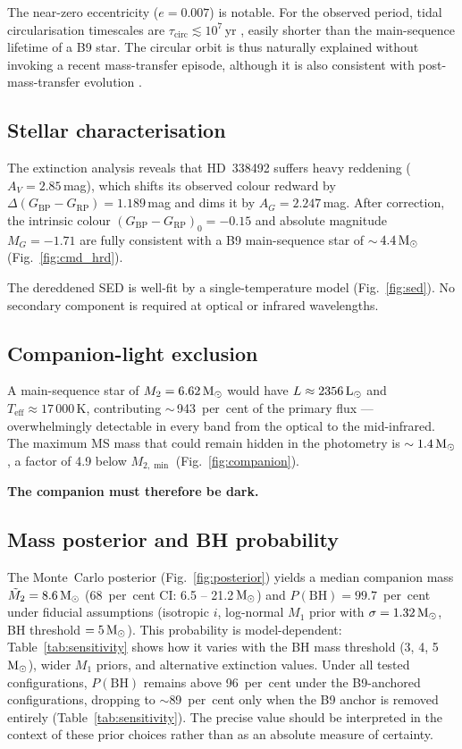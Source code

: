 \documentclass[usenatbib,fleqn]{mnras}
\newcommand{\Msun}{{\rm M}_\odot}
\newcommand{\Lsun}{{\rm L}_\odot}
\begin{document}
The near-zero eccentricity ($e = 0.007$) is notable.  For the
observed period, tidal circularisation timescales are
$\tau_\mathrm{circ} \lesssim 10^7$\,yr \citep{Zahn1977}, easily
shorter than the main-sequence lifetime of a B9 star.  The circular
orbit is thus naturally explained without invoking a recent
mass-transfer episode, although it is also consistent with
post-mass-transfer evolution \citep{Hurley2002}.

\subsection{Stellar characterisation}
\label{sec:results:stellar}

The extinction analysis reveals that HD~338492 suffers heavy
reddening ($A_V = 2.85$\,mag), which shifts its observed colour
redward by $\Delta(G_\mathrm{BP} - G_\mathrm{RP}) = 1.189$\,mag
and dims it by $A_G = 2.247$\,mag.  After correction, the
intrinsic colour
$(G_\mathrm{BP} - G_\mathrm{RP})_0 = -0.15$ and absolute
magnitude $M_G = -1.71$ are fully consistent with a B9 main-sequence
star of $\sim$\,$4.4\,\Msun$ (Fig.~\ref{fig:cmd_hrd}).

The dereddened SED is well-fit by a single-temperature model
(Fig.~\ref{fig:sed}).  No secondary component is required at
optical or infrared wavelengths.

\subsection{Companion-light exclusion}
\label{sec:results:companion}

A main-sequence star of $M_2 = 6.62\,\Msun$ would have
$L \approx 2356\,\Lsun$ and $T_\mathrm{eff} \approx 17\,000$\,K,
contributing $\sim$\,943~per~cent of the primary flux ---
overwhelmingly detectable in every band from the optical to the
mid-infrared.  The maximum MS mass that could remain hidden in the
photometry is $\sim 1.4\,\Msun$, a factor of 4.9 below
$M_{2,\min}$ (Fig.~\ref{fig:companion}).

\textbf{The companion must therefore be dark.}

\subsection{Mass posterior and BH probability}
\label{sec:results:posterior}

The Monte~Carlo posterior (Fig.~\ref{fig:posterior}) yields a median
companion mass $\tilde{M}_2 = 8.6\,\Msun$ (68~per~cent CI:
6.5 -- 21.2\,$\Msun$) and $P(\text{BH}) = 99.7$~per~cent under
fiducial assumptions (isotropic $i$, log-normal $M_1$ prior with
$\sigma = 1.32\,\Msun$, BH threshold
$= 5\,\Msun$).  This probability is model-dependent:
Table~\ref{tab:sensitivity} shows how it varies with the BH
mass threshold (3, 4, 5\,$\Msun$), wider $M_1$ priors, and
alternative extinction values.  Under all tested configurations,
$P(\text{BH})$ remains above 96~per~cent under the
  B9-anchored configurations, dropping to $\sim$89~per~cent only
  when the B9 anchor is removed entirely
  (Table~\ref{tab:sensitivity}).  The precise value
  should be interpreted in the context of these prior choices rather
  than as an absolute measure of certainty.
\end{document}
